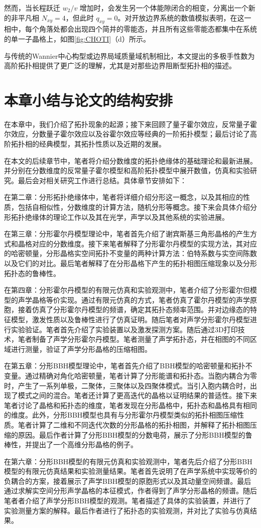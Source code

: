 然而，当长程跃迁 \( w_2/v \) 增加时，会发生另一个体能隙闭合的相变，分离出一个新的非平凡相 \( N_{xy} = 4 \)，但此时 \( q_{xy} = 0 \)。对开放边界系统的数值模拟表明，在这一相中，每个角落处都会出现四个简并的零能态，并且所有这些零能态都集中在系统的单一子晶格上，如图\ref{fig:CHOTI}（d）所示。

与传统的Wannier中心构型或边界局域质量域机制相比，本文提出的多极手性数为高阶拓扑相提供了更广泛的理解，尤其是对那些边界阻断型拓扑相的描述。

\section{本章小结与论文的结构安排}
在本章中，我们介绍了拓扑现象的起源；接下来回顾了量子霍尔效应，反常量子霍尔效应，分数量子霍尔效应{\color{red}以及谷霍尔效应}等经典的一阶拓扑模型；最后讨论了高阶拓扑相的经典模型，其拓扑性质以及近期的发展。

在本文的后续章节中，笔者将介绍分数维度的拓扑绝缘体的基础理论和最新进展。并分别在分数维度的反常量子霍尔模型和高阶拓扑模型中展开数值，仿真和实验研究。最后会对相关研究工作进行总结。具体章节安排如下：

在第二章：分形拓扑绝缘体中，笔者将详细介绍分形这一概念，以及其相应的性质，包括自相似性，分数维度的计算方法，随机分形等概念。接下来会具体介绍分形拓扑绝缘体的理论工作以及其在光学，声学以及其他系统的实验进展。

在第三章：分形霍尔丹模型理论中，笔者首先介绍了谢宾斯基三角形晶格的产生方式和晶格对应的分数维度。接下来笔者解释了分形霍尔丹模型的实现方法，其对应的哈密顿量，分形晶格实空间拓扑不变量的两种计算方法：伯特系数与实空间陈数以及它们的对比。最后笔者解释了在分形晶格下产生的拓扑相图压缩现象以及分形拓扑态的鲁棒性。

在第四章：分形霍尔丹模型的有限元仿真和实验观测中，笔者介绍了分形霍尔但模型的声学晶格等价实现。通过有限元仿真的方式，笔者仿真了霍尔丹模型的声学原胞，接着仿真了分形霍尔丹模型的频谱，确定其拓扑态频率范围。并对边缘态的特征模型，激发性质以及鲁棒性进行了仿真证明。随后笔者对声学分形霍尔丹模型进行实验验证。笔者首先介绍了实验装置以及激发探测方案。随后通过3D打印技术，笔者制备了声学分形霍尔丹模型。笔者测量了声学拓扑态，并在相图的不同区域进行测量，验证了声学分形晶格的压缩相图。

在第五章：分形BBH模型理论中，笔者首先介绍了BBH模型的哈密顿量和拓扑不变量。通过精确对角化哈密顿量，笔者计算了分形能谱和拓扑态。当胞内耦合为零时，产生了一系列单极，二聚体，三聚体以及四聚体模式。当引入胞内耦合时，出现了模式之间的混合。笔者还计算了更高迭代的晶格以证明结果的普适性。接下来笔者讨论了晶格和拓扑态的维度，笔者发现在分形晶格中，拓扑态和晶格具有相同的维度。此外，分形BBH模型也具有与分形霍尔丹模型类似的拓扑相图压缩性质。笔者计算了二维和不同迭代次数的分形晶格的拓扑相图，并解释了拓扑相图压缩的原因。最后作者计算了分形BBH模型的分数电荷，展示了分形BBH模型的鲁棒性，并提出了一个高维分形晶格的例子。

在第六章：分形BBH模型的有限元仿真和实验观测中，笔者先后介绍了分形BBH模型的有限元仿真结果和实验测量结果。笔者首先说明了在声学系统中实现等价的负耦合的方案，接着展示了声学BBH模型的原胞形式以及其动量空间频谱。最后通过求解实空间分形声学晶格的本征模式，作者得到了声学分形晶格的频谱。随后笔者者介绍了声学分形BBH模型的观测。笔者描述了具体的实验装置，并进行了实验测量方案的解释。最后作者进行了拓扑态的实验观测，并对比了实验与仿真结果。
